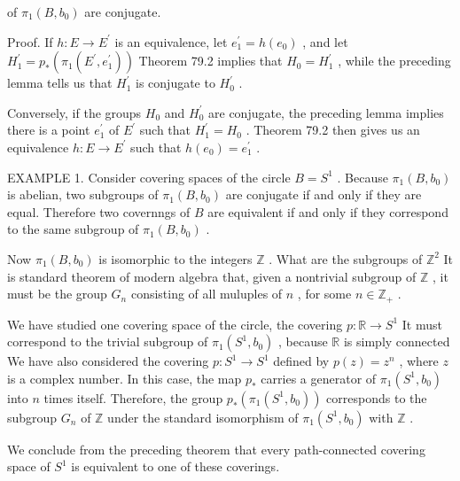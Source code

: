 \documentclass[10pt]{article}
\begin{document}
of \({\pi }_{1}\left( {B,{b}_{0}}\right)\) are conjugate.

Proof. If \(h : E \rightarrow  {E}^{\prime }\) is an equivalence, let \({e}_{1}^{\prime } = h\left( {e}_{0}\right)\) , and let \({H}_{1}^{\prime } = {p}_{ * }\left( {{\pi }_{1}\left( {{E}^{\prime },{e}_{1}^{\prime }}\right) }\right)\) Theorem 79.2 implies that \({H}_{0} = {H}_{1}^{\prime }\) , while the preceding lemma tells us that \({H}_{1}^{\prime }\) is conjugate to \({H}_{0}^{\prime }\) .

Conversely, if the groups \({H}_{0}\) and \({H}_{0}^{\prime }\) are conjugate, the preceding lemma implies there is a point \({e}_{1}^{\prime }\) of \({E}^{\prime }\) such that \({H}_{1}^{\prime } = {H}_{0}\) . Theorem 79.2 then gives us an equivalence \(h : E \rightarrow  {E}^{\prime }\) such that \(h\left( {e}_{0}\right)  = {e}_{1}^{\prime }\) .

EXAMPLE 1. Consider covering spaces of the circle \(B = {S}^{1}\) . Because \({\pi }_{1}\left( {B,{b}_{0}}\right)\) is abelian, two subgroups of \({\pi }_{1}\left( {B,{b}_{0}}\right)\) are conjugate if and only if they are equal. Therefore two covernngs of \(B\) are equivalent if and only if they correspond to the same subgroup of \({\pi }_{1}\left( {B,{b}_{0}}\right)\) .

Now \({\pi }_{1}\left( {B,{b}_{0}}\right)\) is isomorphic to the integers \(\mathbb{Z}\) . What are the subgroups of \({\mathbb{Z}}^{2}\) It is standard theorem of modern algebra that, given a nontrivial subgroup of \(\mathbb{Z}\) , it must be the group \({G}_{n}\) consisting of all muluples of \(n\) , for some \(n \in  {\mathbb{Z}}_{ + }\) .

We have studied one covering space of the circle, the covering \(p : \mathbb{R} \rightarrow  {S}^{1}\) It must correspond to the trivial subgroup of \({\pi }_{1}\left( {{S}^{1},{b}_{0}}\right)\) , because \(\mathbb{R}\) is simply connected We have also considered the covering \(p : {S}^{1} \rightarrow  {S}^{1}\) defined by \(p\left( z\right)  = {z}^{n}\) , where \(z\) is a complex number. In this case, the map \({p}_{ * }\) carries a generator of \({\pi }_{1}\left( {{S}^{1},{b}_{0}}\right)\) into \(n\) times itself. Therefore, the group \({p}_{ * }\left( {{\pi }_{1}\left( {{S}^{1},{b}_{0}}\right) }\right)\) corresponds to the subgroup \({G}_{n}\) of \(\mathbb{Z}\) under the standard isomorphism of \({\pi }_{1}\left( {{S}^{1},{b}_{0}}\right)\) with \(\mathbb{Z}\) .

We conclude from the preceding theorem that every path-connected covering space of \({S}^{1}\) is equivalent to one of these coverings.
\end{document}
